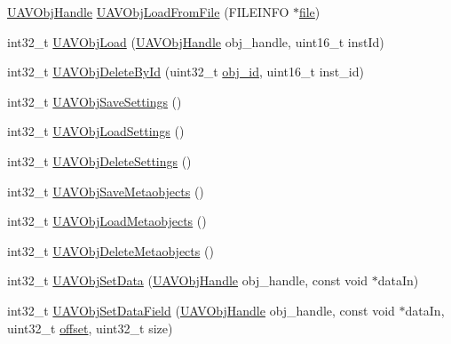 \begin{DoxyCompactItemize}
\item 
\hyperlink{targets_2_u_a_v_objects_2inc_2uavobjectmanager_8h_a279053e22be53ce9f895043aaeb91e3b}{\-U\-A\-V\-Obj\-Handle} \hyperlink{group___u_a_v_object_handling_ga851caa15c5807d5affbd6095d3cdaca7}{\-U\-A\-V\-Obj\-Load\-From\-File} (\-F\-I\-L\-E\-I\-N\-F\-O $\ast$\hyperlink{group___w_a_v_e_p_l_a_y_e_r___private___variables_ga48b699d30a027a1d6326588c99d716e1}{file})
\item 
int32\-\_\-t \hyperlink{group___u_a_v_object_handling_gaf028fed8e3025656c7436ce6a7340e44}{\-U\-A\-V\-Obj\-Load} (\hyperlink{targets_2_u_a_v_objects_2inc_2uavobjectmanager_8h_a279053e22be53ce9f895043aaeb91e3b}{\-U\-A\-V\-Obj\-Handle} obj\-\_\-handle, uint16\-\_\-t inst\-Id)
\item 
int32\-\_\-t \hyperlink{group___u_a_v_object_handling_gad00323c86e457fbe63ec177cd55c2864}{\-U\-A\-V\-Obj\-Delete\-By\-Id} (uint32\-\_\-t \hyperlink{pios__flashfs__logfs_8c_a4901f00431a2c948153bd4f187fce556}{obj\-\_\-id}, uint16\-\_\-t inst\-\_\-id)
\item 
int32\-\_\-t \hyperlink{group___u_a_v_object_handling_ga6282540dd888720334943f3b3ad5f301}{\-U\-A\-V\-Obj\-Save\-Settings} ()
\item 
int32\-\_\-t \hyperlink{group___u_a_v_object_handling_ga961f3df74e4106ee108a10b57536302f}{\-U\-A\-V\-Obj\-Load\-Settings} ()
\item 
int32\-\_\-t \hyperlink{group___u_a_v_object_handling_ga5f40e35848fe223463778b90e8035cbd}{\-U\-A\-V\-Obj\-Delete\-Settings} ()
\item 
int32\-\_\-t \hyperlink{group___u_a_v_object_handling_ga203ebba7c25227245b1ae5abd38492c4}{\-U\-A\-V\-Obj\-Save\-Metaobjects} ()
\item 
int32\-\_\-t \hyperlink{group___u_a_v_object_handling_ga014c904f7cc34d6bb5a5a1f23ebe3364}{\-U\-A\-V\-Obj\-Load\-Metaobjects} ()
\item 
int32\-\_\-t \hyperlink{group___u_a_v_object_handling_ga74aba825a99924f3c8e3f7c209409ab6}{\-U\-A\-V\-Obj\-Delete\-Metaobjects} ()
\item 
int32\-\_\-t \hyperlink{group___u_a_v_object_handling_gaca346cc577b81ba51cde8f793cdaf969}{\-U\-A\-V\-Obj\-Set\-Data} (\hyperlink{targets_2_u_a_v_objects_2inc_2uavobjectmanager_8h_a279053e22be53ce9f895043aaeb91e3b}{\-U\-A\-V\-Obj\-Handle} obj\-\_\-handle, const void $\ast$data\-In)
\item 
int32\-\_\-t \hyperlink{group___u_a_v_object_handling_gab4d774a4a829bc754878021d3bcb195f}{\-U\-A\-V\-Obj\-Set\-Data\-Field} (\hyperlink{targets_2_u_a_v_objects_2inc_2uavobjectmanager_8h_a279053e22be53ce9f895043aaeb91e3b}{\-U\-A\-V\-Obj\-Handle} obj\-\_\-handle, const void $\ast$data\-In, uint32\-\_\-t \hyperlink{group___sparky_b_l_gaa9fff43968831437a312428836cab362}{offset}, uint32\-\_\-t size)

\end{DoxyCompactItemize}
